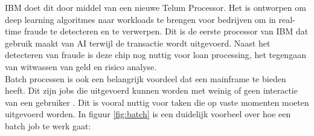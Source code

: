 IBM doet dit door middel van een nieuwe Telum Processor. Het is ontworpen om deep learning algoritmes naar workloads te brengen voor bedrijven om in real-time fraude te detecteren en te verwerpen. Dit is de eerste processor van IBM dat gebruik maakt van AI terwijl de transactie wordt uitgevoerd. Naast het detecteren van fraude is deze chip nog nuttig voor loan processing, het tegengaan van witwassen van geld en risico analyse. \autocite{IBM2021a} \\

Batch processen is ook een belangrijk voordeel dat een mainframe te bieden heeft. Dit zijn jobs die uitgevoerd kunnen worden met weinig of geen interactie van een gebruiker \autocite{IBM}. Dit is vooral nuttig voor taken die op vaste momenten moeten uitgevoerd worden. In figuur \ref{fig:batch} is een duidelijk voorbeel over hoe een batch job te werk gaat:

